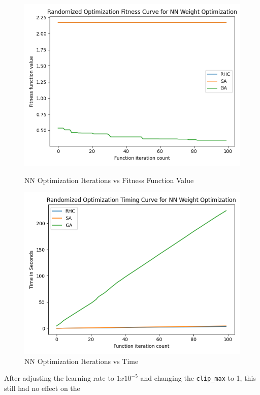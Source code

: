 \documentclass[11pt]{article}
\begin{document}
    \begin{figure}
        \begin{minipage}{0.5\textwidth}
            \centering
            \includegraphics[width=0.9\linewidth]{nn1.png}
            \caption{NN Optimization Iterations vs Fitness Function Value}\label{Fig:NN Optimization Iterations vs Fitness Function Value}
        \end{minipage}\hfill
        \begin{minipage}{0.5\textwidth}
            \centering
            \includegraphics[width=0.9\linewidth]{nn2.png}
            \caption{NN Optimization Iterations vs Time}\label{Fig:NN Optimization Iterations vs Time}
        \end{minipage}
    \end{figure}
    After adjusting the learning rate to $1 x 10^{-5}$ and changing the \texttt{clip\_max} to 1, this still had no effect on the
\end{document}
